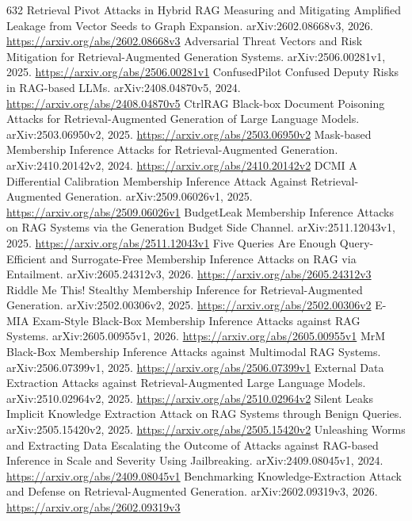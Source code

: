 \documentclass[11pt]{article}
\begin{document}
\begin{thebibliography}{632}
 Retrieval Pivot Attacks in Hybrid RAG Measuring and Mitigating Amplified Leakage from Vector Seeds to Graph Expansion. arXiv:2602.08668v3, 2026. \url{https://arxiv.org/abs/2602.08668v3}
 Adversarial Threat Vectors and Risk Mitigation for Retrieval-Augmented Generation Systems. arXiv:2506.00281v1, 2025. \url{https://arxiv.org/abs/2506.00281v1}
 ConfusedPilot Confused Deputy Risks in RAG-based LLMs. arXiv:2408.04870v5, 2024. \url{https://arxiv.org/abs/2408.04870v5}
 CtrlRAG Black-box Document Poisoning Attacks for Retrieval-Augmented Generation of Large Language Models. arXiv:2503.06950v2, 2025. \url{https://arxiv.org/abs/2503.06950v2}
 Mask-based Membership Inference Attacks for Retrieval-Augmented Generation. arXiv:2410.20142v2, 2024. \url{https://arxiv.org/abs/2410.20142v2}
 DCMI A Differential Calibration Membership Inference Attack Against Retrieval-Augmented Generation. arXiv:2509.06026v1, 2025. \url{https://arxiv.org/abs/2509.06026v1}
 BudgetLeak Membership Inference Attacks on RAG Systems via the Generation Budget Side Channel. arXiv:2511.12043v1, 2025. \url{https://arxiv.org/abs/2511.12043v1}
 Five Queries Are Enough Query-Efficient and Surrogate-Free Membership Inference Attacks on RAG via Entailment. arXiv:2605.24312v3, 2026. \url{https://arxiv.org/abs/2605.24312v3}
 Riddle Me This! Stealthy Membership Inference for Retrieval-Augmented Generation. arXiv:2502.00306v2, 2025. \url{https://arxiv.org/abs/2502.00306v2}
 E-MIA Exam-Style Black-Box Membership Inference Attacks against RAG Systems. arXiv:2605.00955v1, 2026. \url{https://arxiv.org/abs/2605.00955v1}
 MrM Black-Box Membership Inference Attacks against Multimodal RAG Systems. arXiv:2506.07399v1, 2025. \url{https://arxiv.org/abs/2506.07399v1}
 External Data Extraction Attacks against Retrieval-Augmented Large Language Models. arXiv:2510.02964v2, 2025. \url{https://arxiv.org/abs/2510.02964v2}
 Silent Leaks Implicit Knowledge Extraction Attack on RAG Systems through Benign Queries. arXiv:2505.15420v2, 2025. \url{https://arxiv.org/abs/2505.15420v2}
 Unleashing Worms and Extracting Data Escalating the Outcome of Attacks against RAG-based Inference in Scale and Severity Using Jailbreaking. arXiv:2409.08045v1, 2024. \url{https://arxiv.org/abs/2409.08045v1}
 Benchmarking Knowledge-Extraction Attack and Defense on Retrieval-Augmented Generation. arXiv:2602.09319v3, 2026. \url{https://arxiv.org/abs/2602.09319v3}

\end{thebibliography}
\end{document}
